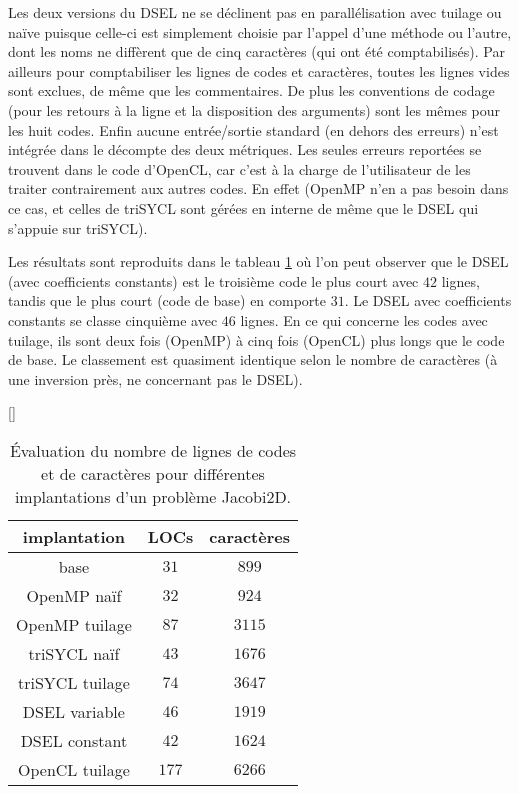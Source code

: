 Les deux versions du DSEL ne se déclinent pas en parallélisation avec tuilage ou naïve puisque celle-ci est simplement choisie par l'appel d'une méthode ou l'autre, dont les noms ne diffèrent que de cinq caractères (qui ont été comptabilisés). Par ailleurs pour comptabiliser les lignes de codes et caractères, toutes les lignes vides sont exclues, de même que les commentaires. De plus les conventions de codage (pour les retours à la ligne et la disposition des arguments) sont les mêmes pour les huit codes. Enfin aucune entrée/sortie standard (en dehors des erreurs) n'est intégrée dans le décompte des deux métriques. Les seules erreurs reportées se trouvent dans le code d'\textsf{OpenCL}, car c'est à la charge de l'utilisateur de les traiter contrairement aux autres codes. En effet (\textsf{OpenMP} n'en a pas besoin dans ce cas, et celles de \textsf{triSYCL} sont gérées en interne de même que le DSEL qui s'appuie sur \textsf{triSYCL}).

Les résultats sont reproduits dans le tableau \ref{tab:eval_qual} où l'on peut observer que le DSEL (avec coefficients constants) est le troisième code le plus court avec $42$ lignes, tandis que le plus court (code de base) en comporte $31$. Le DSEL avec coefficients constants se classe cinquième avec $46$ lignes. En ce qui concerne les codes avec tuilage, ils sont deux fois (\textsf{OpenMP}) à cinq fois (\textsf{OpenCL}) plus longs que le code de base. Le classement est quasiment identique selon le nombre de caractères (à une inversion près, ne concernant pas le DSEL).

\begin{table}
[\FBwidth]
{
\caption{Évaluation du nombre de lignes de codes et de caractères pour différentes implantations d'un problème Jacobi2D.}
\label{tab:eval_qual}
}
{
\begin{tabular}{||c||c|c||}
\hline
implantation & LOCs & caractères \\
\hline
\hline
base & $31$ & $899$ \\
\hline
OpenMP naïf & $32$ & $924$ \\
\hline
OpenMP tuilage & $87$ & $3115$ \\
\hline
triSYCL naïf & $43$ & $1676$ \\
\hline
triSYCL tuilage & $74$ & $3647$ \\
\hline
DSEL variable & $46$ & $1919$ \\
\hline
DSEL constant & $42$ & $1624$ \\
\hline
OpenCL tuilage & $177$ & $6266$ \\
\hline
\end{tabular}
}
\end{table}

